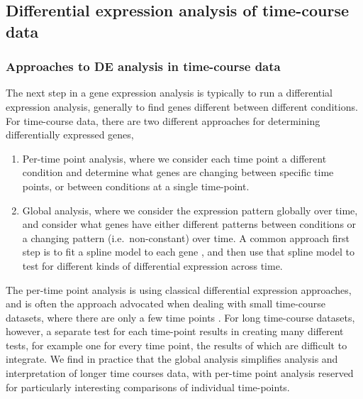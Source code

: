 \documentclass[9pt,a4paper,]{extarticle}
\begin{document}
\hypertarget{differential-expression-analysis-of-time-course-data}{%
\subsection{Differential expression analysis of time-course data}\label{differential-expression-analysis-of-time-course-data}}

\hypertarget{approaches-to-de-analysis-in-time-course-data}{%
\subsubsection{Approaches to DE analysis in time-course data}\label{approaches-to-de-analysis-in-time-course-data}}

The next step in a gene expression analysis is typically to run a differential
expression analysis, generally to find genes different between different
conditions. For time-course data, there are two different approaches for
determining differentially expressed genes,

\begin{enumerate}
\def\labelenumi{\arabic{enumi})}
\item
  Per-time point analysis, where we consider each time point a different
  condition and determine what genes are changing between specific time points, or
  between conditions at a single time-point.
\item
  Global analysis, where we consider the expression pattern globally over
  time, and consider what genes have either different patterns between
  conditions or a changing pattern (i.e.~non-constant) over time. A common
  approach first step is to fit a spline model to each gene
  \citep{storey:significance}, and then use that spline model to test for different
  kinds of differential expression across time.
\end{enumerate}

The per-time point analysis is using classical differential expression
approaches, and is often the approach advocated when dealing with small
time-course datasets, where there are only a few time points \citep{ritchie:limma, robinson:edgeR, love:moderated}. For long time-course datasets, however, a
separate test for each time-point results in creating many different tests,
for example one for every time point, the results of which are difficult to
integrate. We find in practice that the global analysis simplifies analysis
and interpretation of longer time courses data, with per-time point analysis
reserved for particularly interesting comparisons of individual time-points.
\end{document}
